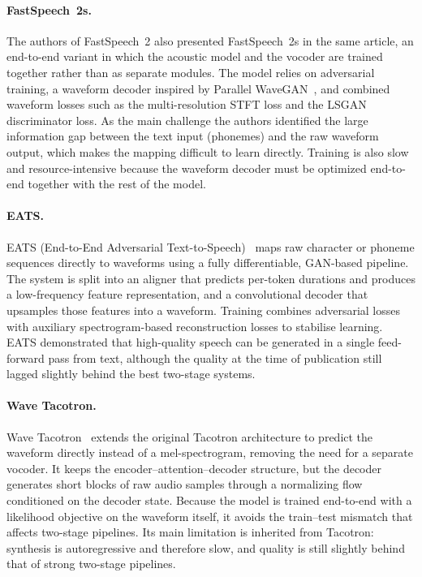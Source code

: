\documentclass[
         english, %
    monochrome, %
]{VUMIFSEMasterThesis}
\begin{document}
\paragraph{FastSpeech~2s.}
The authors of FastSpeech~2 also presented FastSpeech~2s in the same article, an end-to-end variant in which the acoustic model and the vocoder are trained together rather than as separate modules.
The model relies on adversarial training, a waveform decoder inspired by Parallel WaveGAN~\cite{yamamoto2020parallel}, and combined waveform losses such as the multi-resolution STFT loss and the LSGAN discriminator loss.
As the main challenge the authors identified the large information gap between the text input (phonemes) and the raw waveform output, which makes the mapping difficult to learn directly.
Training is also slow and resource-intensive because the waveform decoder must be optimized end-to-end together with the rest of the model.

\paragraph{EATS.}
EATS (End-to-End Adversarial Text-to-Speech)~\cite{donahue2020end} maps raw character or phoneme sequences directly to waveforms using a fully differentiable, GAN-based pipeline.
The system is split into an aligner that predicts per-token durations and produces a low-frequency feature representation, and a convolutional decoder that upsamples those features into a waveform.
Training combines adversarial losses with auxiliary spectrogram-based reconstruction losses to stabilise learning.
EATS demonstrated that high-quality speech can be generated in a single feed-forward pass from text, although the quality at the time of publication still lagged slightly behind the best two-stage systems.

\paragraph{Wave Tacotron.}
Wave Tacotron~\cite{weiss2021wave} extends the original Tacotron architecture to predict the waveform directly instead of a mel-spectrogram, removing the need for a separate vocoder.
It keeps the encoder--attention--decoder structure, but the decoder generates short blocks of raw audio samples through a normalizing flow conditioned on the decoder state.
Because the model is trained end-to-end with a likelihood objective on the waveform itself, it avoids the train--test mismatch that affects two-stage pipelines.
Its main limitation is inherited from Tacotron: synthesis is autoregressive and therefore slow, and quality is still slightly behind that of strong two-stage pipelines.
\end{document}
